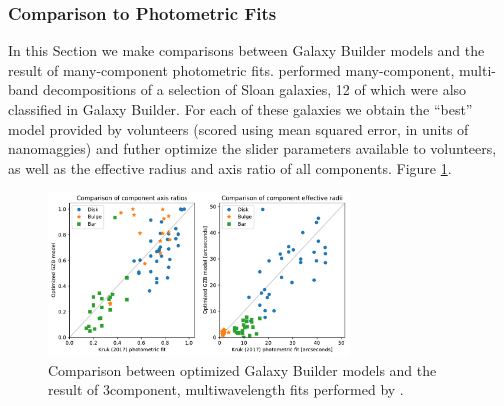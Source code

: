 \documentclass[../main.tex]{subfiles}
\begin{document}
\subsubsection{Comparison to Photometric Fits}
In this Section we make comparisons between Galaxy Builder models and the result of many-component photometric fits. \citet{Kruk2017:1710.00093v2} performed many-component, multi-band decompositions of a selection of Sloan galaxies, 12 of which were also classified in Galaxy Builder. For each of these galaxies we obtain the ``best'' model provided by volunteers (scored using mean squared error, in units of nanomaggies) and futher optimize the slider parameters available to volunteers, as well as the effective radius and axis ratio of all components. Figure \ref{fig:sd_comp_comparison}.

\begin{figure}
  \includegraphics[width=8cm]{images__results/sd_comp_comparison.pdf}
  \caption{Comparison between optimized Galaxy Builder models and the result of 3\-component, multi\-wavelength fits performed by \citet{Kruk2017:1710.00093v2}.}
  \label{fig:sd_comp_comparison}
\end{figure}
\end{document}
